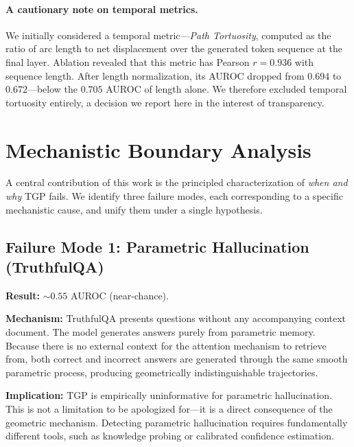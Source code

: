 \documentclass[10pt]{article}
\newcommand{\tgp}{\textsc{TGP}\xspace}
\begin{document}
\paragraph{A cautionary note on temporal metrics.}
We initially considered a temporal metric---\emph{Path Tortuosity}, computed as the ratio of arc length to net displacement over the generated token sequence at the final layer.
Ablation revealed that this metric has Pearson $r = 0.936$ with sequence length.
After length normalization, its AUROC dropped from $0.694$ to $0.672$---below the $0.705$ AUROC of length alone.
We therefore excluded temporal tortuosity entirely, a decision we report here in the interest of transparency.

\section{Mechanistic Boundary Analysis}
\label{sec:boundary}

A central contribution of this work is the principled characterization of \emph{when and why} \tgp fails.
We identify three failure modes, each corresponding to a specific mechanistic cause, and unify them under a single hypothesis.

\subsection{Failure Mode 1: Parametric Hallucination (TruthfulQA)}
\label{sec:failure-parametric}

\textbf{Result:} ${\sim}0.55$ AUROC (near-chance).

\textbf{Mechanism:}
TruthfulQA presents questions without any accompanying context document.
The model generates answers purely from parametric memory.
Because there is no external context for the attention mechanism to retrieve from, both correct and incorrect answers are generated through the same smooth parametric process, producing geometrically indistinguishable trajectories.

\textbf{Implication:}
\tgp is empirically uninformative for parametric hallucination.
This is not a limitation to be apologized for---it is a direct consequence of the geometric mechanism.
Detecting parametric hallucination requires fundamentally different tools, such as knowledge probing \citep{burns2022discovering} or calibrated confidence estimation.
\end{document}
